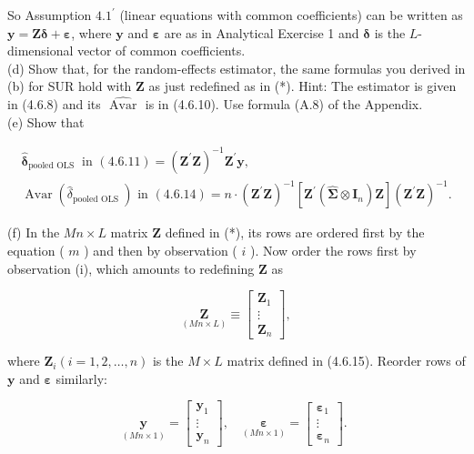 \documentclass[10pt]{article}
\begin{document}
So Assumption $4.1^{\prime}$ (linear equations with common coefficients) can be written as $\mathbf{y}=\mathbf{Z} \boldsymbol{\delta}+\boldsymbol{\varepsilon}$, where $\mathbf{y}$ and $\boldsymbol{\varepsilon}$ are as in Analytical Exercise 1 and $\boldsymbol{\delta}$ is the $L$-dimensional vector of common coefficients.\\
(d) Show that, for the random-effects estimator, the same formulas you derived in (b) for SUR hold with $\mathbf{Z}$ as just redefined as in (*). Hint: The estimator is given in (4.6.8) and its $\widehat{\text { Avar }}$ is in (4.6.10). Use formula (A.8) of the Appendix.\\
(e) Show that

$$
\begin{gathered}
\hat{\boldsymbol{\delta}}_{\text {pooled OLS }} \text { in }(4.6 .11)=\left(\mathbf{Z}^{\prime} \mathbf{Z}\right)^{-1} \mathbf{Z}^{\prime} \mathbf{y}, \\
\operatorname{Avar}\left(\hat{\delta}_{\text {pooled OLS }}\right) \text { in }(4.6 .14)=n \cdot\left(\mathbf{Z}^{\prime} \mathbf{Z}\right)^{-1}\left[\mathbf{Z}^{\prime}\left(\widehat{\mathbf{\Sigma}} \otimes \mathbf{I}_{n}\right) \mathbf{Z}\right]\left(\mathbf{Z}^{\prime} \mathbf{Z}\right)^{-1} .
\end{gathered}
$$

(f) In the $M n \times L$ matrix $\mathbf{Z}$ defined in (*), its rows are ordered first by the equation ( $m$ ) and then by observation ( $i$ ). Now order the rows first by observation (i), which amounts to redefining $\mathbf{Z}$ as

$$
\underset{(M n \times L)}{\mathbf{Z}} \equiv\left[\begin{array}{c}
\mathbf{Z}_{1} \\
\vdots \\
\mathbf{Z}_{n}
\end{array}\right],
$$

where $\mathbf{Z}_{i}(i=1,2, \ldots, n)$ is the $M \times L$ matrix defined in (4.6.15). Reorder rows of $\mathbf{y}$ and $\boldsymbol{\varepsilon}$ similarly:

$$
\underset{(M n \times 1)}{\mathbf{y}}=\left[\begin{array}{c}
\mathbf{y}_{1} \\
\vdots \\
\mathbf{y}_{n}
\end{array}\right], \quad \underset{(M n \times 1)}{\boldsymbol{\varepsilon}}=\left[\begin{array}{c}
\boldsymbol{\varepsilon}_{1} \\
\vdots \\
\boldsymbol{\varepsilon}_{n}
\end{array}\right] \text {. }
$$
\end{document}
